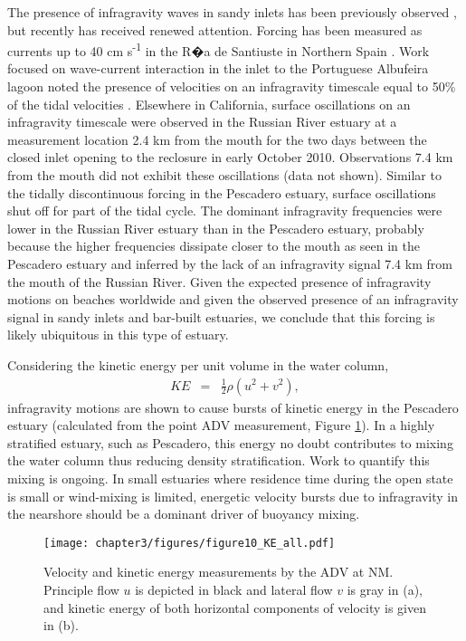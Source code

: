 The presence of infragravity waves in sandy inlets has been previously
observed\emph{ \parencite{schubert_infragravity_1991}}, but recently has
received renewed attention. Forcing has been measured as currents
up to 40 cm s\textsuperscript{-1} in the R�a de Santiuste in Northern
Spain \parencite{uncles_infragravity_2014}. Work focused on wave-current interaction
in the inlet to the Portuguese Albufeira lagoon noted the presence
of velocities on an infragravity timescale equal to 50\% of the tidal
velocities \parencite{dodet_wave-current_2013}. Elsewhere in California, surface
oscillations on an infragravity timescale were observed in the Russian
River estuary at a measurement location 2.4 km from the mouth for
the two days between the closed inlet opening to the reclosure in
early October 2010. Observations 7.4 km from the mouth did not exhibit
these oscillations (data not shown). Similar to the tidally discontinuous
forcing in the Pescadero estuary, surface oscillations shut off for
part of the tidal cycle. The dominant infragravity frequencies were
lower in the Russian River estuary than in the Pescadero estuary,
probably because the higher frequencies dissipate closer to the mouth
as seen in the Pescadero estuary and inferred by the lack of an infragravity
signal 7.4 km from the mouth of the Russian River. Given the expected
presence of infragravity motions on beaches worldwide \parencite{contardo_infragravity_2013}
and given the observed presence of an infragravity signal in sandy
inlets and bar-built estuaries, we conclude that this forcing is likely
ubiquitous in this type of estuary.

Considering the kinetic energy per unit volume in the water column,
\begin{eqnarray}
KE & = & \frac{1}{2}\rho(u^{2}+v^{2}),\label{eq:KE}
\end{eqnarray}
 infragravity motions are shown to cause bursts of kinetic energy
in the Pescadero estuary (calculated from the point ADV measurement,
Figure \ref{f9_KE}). In a highly stratified estuary, such as Pescadero,
this energy no doubt contributes to mixing the water column thus reducing
density stratification. Work to quantify this mixing is ongoing. In
small estuaries where residence time during the open state is small
or wind-mixing is limited, energetic velocity bursts due to infragravity
in the nearshore should be a dominant driver of buoyancy mixing. 


\begin{figure}
\texttt{[image: chapter3/figures/figure10\_KE\_all.pdf]}\protect\caption{Velocity and kinetic energy measurements by the ADV at NM. Principle
flow $u$ is depicted in black and lateral flow $v$ is gray in (a),
and kinetic energy of both horizontal components of velocity is given
in (b). \label{f9_KE}}
\end{figure}


